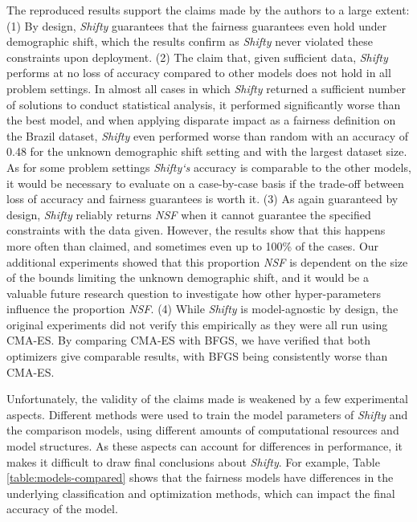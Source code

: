 The reproduced results support the claims made by the authors to a large extent: (1) By design, \textit{Shifty} guarantees that the fairness guarantees even hold under demographic shift, which the results confirm as \textit{Shifty} never violated these constraints upon deployment. (2) The claim that, given sufficient data, \textit{Shifty} performs at no loss of accuracy compared to other models does not hold in all problem settings. In almost all cases in which \textit{Shifty} returned a sufficient number of solutions to conduct statistical analysis, it performed significantly worse than the best model, and when applying disparate impact as a fairness definition on the Brazil dataset, \textit{Shifty} even performed worse than random with an accuracy of 0.48 for the unknown demographic shift setting and with the largest dataset size. As for some problem settings \textit{Shifty`s} accuracy is comparable to the other models, it would be necessary to evaluate on a case-by-case basis if the trade-off between loss of accuracy and fairness guarantees is worth it.
(3) As again guaranteed by design, \textit{Shifty} reliably returns \textit{NSF} when it cannot guarantee the specified constraints with the data given. However, the results show that this happens more often than claimed, and sometimes even up to 100\% of the cases. Our additional experiments showed that this proportion \textit{NSF} is dependent on the size of the bounds limiting the unknown demographic shift, and it would be a valuable future research question to investigate how other hyper-parameters influence the proportion \textit{NSF}. (4) While \textit{Shifty} is model-agnostic by design, the original experiments did not verify this empirically as they were all run using CMA-ES. By comparing CMA-ES with BFGS, we have verified that both optimizers give comparable results, with BFGS being consistently worse than CMA-ES.

Unfortunately, the validity of the claims made is weakened by a few experimental aspects. Different methods were used to train the model parameters of \textit{Shifty} and the comparison models, using different amounts of computational resources and model structures. As these aspects can account for differences in performance, it makes it difficult to draw final conclusions about \textit{Shifty}. For example, Table \ref{table:models-compared} shows that the fairness models have differences in the underlying classification and optimization methods, which can impact the final accuracy of the model. \\

